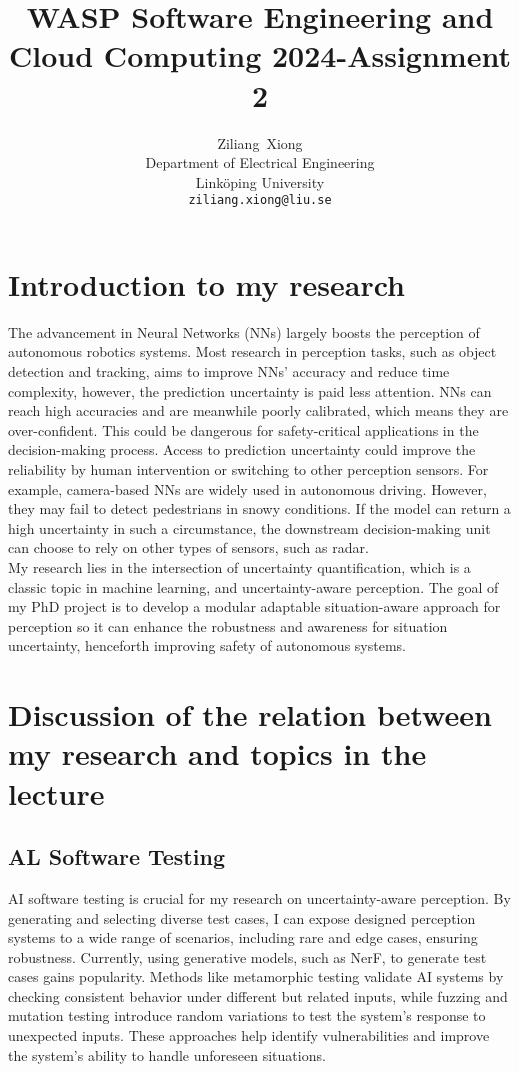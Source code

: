 \documentclass{article}
\title{WASP Software Engineering and Cloud Computing 2024-Assignment 2}
\author{
  Ziliang~Xiong \\
  Department of Electrical Engineering\\
  Linköping University\\
  \texttt{ziliang.xiong@liu.se} \\
}
\begin{document}
\maketitle

\section{Introduction to my research}
The advancement in Neural Networks (NNs) largely boosts the perception of autonomous robotics systems. Most research in perception tasks, such as object detection and tracking, aims to improve NNs' accuracy and reduce time complexity, however, the prediction uncertainty is paid less attention. NNs can reach high accuracies and are meanwhile poorly calibrated, which means they are over-confident. This could be dangerous for safety-critical applications in the decision-making process. Access to prediction uncertainty could improve the reliability by human intervention or switching to other perception sensors. For example, camera-based NNs are widely used in autonomous driving. However, they may fail to detect pedestrians in snowy conditions. If the model can return a high uncertainty in such a circumstance, the downstream decision-making unit can choose to rely on other types of sensors, such as radar.\\

My research lies in the intersection of uncertainty quantification, which is a classic topic in machine learning, and uncertainty-aware perception. The goal of my PhD project is to develop a modular adaptable situation-aware approach for perception so it can enhance the robustness and awareness for situation uncertainty, henceforth improving safety of autonomous systems.


\section{Discussion of the relation between my research and topics in the lecture}

\subsection{AL Software Testing}
AI software testing is crucial for my research on uncertainty-aware perception. By generating and selecting diverse test cases, I can expose designed perception systems to a wide range of scenarios, including rare and edge cases, ensuring robustness.
Currently, using generative models, such as NerF, to generate test cases gains popularity.
Methods like metamorphic testing validate AI systems by checking consistent behavior under different but related inputs, while fuzzing and mutation testing introduce random variations to test the system's response to unexpected inputs. These approaches help identify vulnerabilities and improve the system's ability to handle unforeseen situations.
\end{document}
